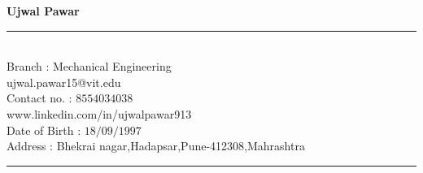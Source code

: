 \documentclass[11pt]{article}
\begin{document}
	
	\begin{center}
		\begin{huge}
			\textbf{Ujwal Pawar}\\
		\end{huge}
	\end{center}

\noindent\rule{6.5in}{0.4pt}\\
Branch : Mechanical Engineering\\
ujwal.pawar15@vit.edu\\
Contact no. : $8554034038$ \\      
www.linkedin.com/in/ujwalpawar913\\
Date of Birth : $18/09/1997$ \\
Address : Bhekrai nagar,Hadapsar,Pune-412308,Mahrashtra\\
\noindent\rule{6.5in}{0.4pt}\\
\end{document}
